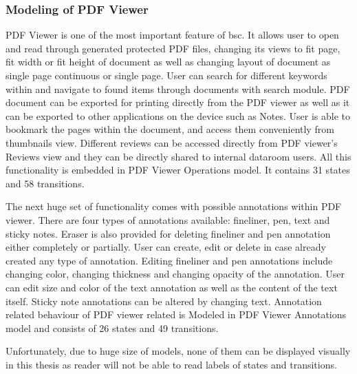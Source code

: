 \subsubsection{Modeling of PDF Viewer}
\par
PDF Viewer is one of the most important feature of \acrshort{bsc}. It allows user to open and read through generated protected PDF files, changing its views to fit page, fit width or fit height of document as well as changing layout of document as single page continuous or single page. User can search for different keywords within and navigate to found items through documents with search module. PDF document can be exported for printing directly from the PDF viewer as well as it can be exported to other applications on the device such as Notes. User is able to bookmark the pages within the document, and access them conveniently from thumbnails view. Different reviews can be accessed directly from PDF viewer's Reviews view and they can be directly shared to internal dataroom users. All this functionality is embedded in PDF Viewer Operations model. It contains 31 states and 58 transitions.

\par
The next huge set of functionality comes with possible annotations within PDF viewer. There are four types of annotations available: fineliner, pen, text and sticky notes. Eraser is also provided for deleting fineliner and pen annotation either completely or partially. User can create, edit or delete in case already created any type of annotation. Editing fineliner and pen annotations include changing color, changing thickness and changing opacity of the annotation. User can edit size and color of the text annotation as well as the content of the text itself. Sticky note annotations can be altered by changing text. Annotation related behaviour of PDF viewer related is Modeled in PDF Viewer Annotations model and consists of 26 states and 49 transitions.

\par
Unfortunately, due to huge size of models, none of them can be displayed visually in this thesis as reader will not be able to read labels of states and transitions.

